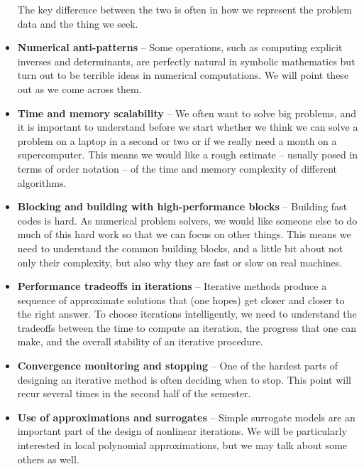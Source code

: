 \begin{itemize}
  The key difference between the two is often in how we represent the
  problem data and the thing we seek.
\item {\bf Numerical anti-patterns} -- Some operations, such as
  computing explicit inverses and determinants, are perfectly natural
  in symbolic mathematics but turn out to be terrible ideas in
  numerical computations.  We will point these out as we come across
  them.
\item {\bf Time and memory scalability} -- We often want to solve
  big problems, and it is important to understand before we start
  whether we think we can solve a problem on a laptop in a second or
  two or if we really need a month on a supercomputer.  This means
  we would like a rough estimate -- usually posed in terms of order notation
  -- of the time and memory complexity of different algorithms.
\item {\bf Blocking and building with high-performance blocks} --
  Building fast codes is hard.  As numerical problem solvers, we would
  like someone else to do much of this hard work so that we can focus
  on other things.  This means we need to understand the common
  building blocks, and a little bit about not only their complexity,
  but also why they are fast or slow on real machines.
\item {\bf Performance tradeoffs in iterations} -- Iterative methods
  produce a sequence of approximate solutions that (one hopes) get
  closer and closer to the right answer.  To choose iterations
  intelligently, we need to understand the tradeoffs between the
  time to compute an iteration, the progress that one can make, and
  the overall stability of an iterative procedure.
\item {\bf Convergence monitoring and stopping} -- One of the hardest
  parts of designing an iterative method is often deciding when to
  stop.  This point will recur several times in the second half of the
  semester.
\item {\bf Use of approximations and surrogates} -- Simple surrogate
  models are an important part of the design of nonlinear iterations.
  We will be particularly interested in local polynomial
  approximations, but we may talk about some others as well.
\end{itemize}
